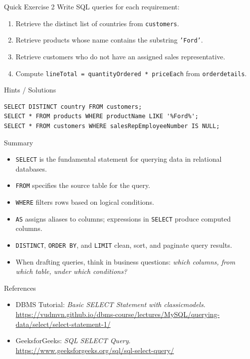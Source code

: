 \documentclass[aspectratio=169,11pt]{beamer}
\newcommand{\kw}[1]{\textcolor{sqlblue}{\texttt{#1}}}
\begin{document}
\begin{frame}[fragile]{Quick Exercise 2}
Write SQL queries for each requirement:
\begin{enumerate}
  \item Retrieve the distinct list of countries from \texttt{customers}.
  \item Retrieve products whose name contains the substring \texttt{'Ford'}.
  \item Retrieve customers who do not have an assigned sales representative.
  \item Compute \texttt{lineTotal = quantityOrdered * priceEach} from \texttt{orderdetails}.
\end{enumerate}
\pause
\begin{block}{Hints / Solutions}
\begin{lstlisting}
SELECT DISTINCT country FROM customers;
SELECT * FROM products WHERE productName LIKE '%Ford%';
SELECT * FROM customers WHERE salesRepEmployeeNumber IS NULL;
\end{lstlisting}
\end{block}
\end{frame}

\begin{frame}{Summary}
\begin{itemize}
  \item \kw{SELECT} is the fundamental statement for querying data in relational databases.
  \item \kw{FROM} specifies the source table for the query.
  \item \kw{WHERE} filters rows based on logical conditions.
  \item \kw{AS} assigns aliases to columns; expressions in \kw{SELECT} produce computed columns.
  \item \kw{DISTINCT}, \kw{ORDER BY}, and \kw{LIMIT} clean, sort, and paginate query results.
  \item When drafting queries, think in business questions: \textit{which columns, from which table, under which conditions?}
\end{itemize}
\end{frame}

\begin{frame}{References}
\small
\begin{itemize}
  \item DBMS Tutorial: \textit{Basic SELECT Statement with classicmodels}.\\
  {\tiny\url{https://vudmvn.github.io/dbms-course/lectures/MySQL/querying-data/select/select-statement-1/}}
  \item GeeksforGeeks: \textit{SQL SELECT Query}.\\
  {\tiny\url{https://www.geeksforgeeks.org/sql/sql-select-query/}}
\end{itemize}
\end{frame}
\end{document}
